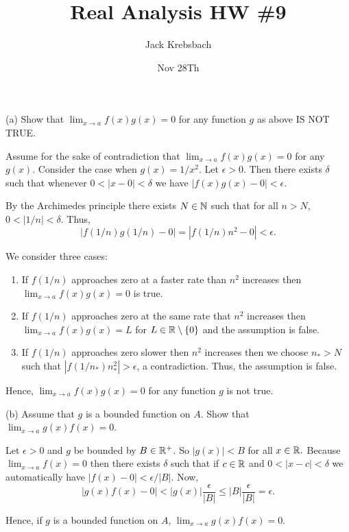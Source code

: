 \documentclass{report}
\title{Real Analysis HW \#9}
\author{Jack Krebsbach }
\date{Nov 28Th}
\begin{document}
\maketitle


(a) Show that $\lim _{x \rightarrow a} f(x) g(x)=0$ for any function $g$ as above IS NOT TRUE.

\begin{myproof}
     Assume for the sake of contradiction that $\lim _{x \rightarrow a} f(x) g(x)=0$ for  any $g(x).$ Consider the case when $g(x)= 1/x^2.$ Let $\epsilon >0.$ Then there exists $\delta$ such that whenever $0 < |x - 0| < \delta$ we have $|f(x)g(x) -0|<\epsilon.$

  By the Archimedes principle there exists $N \in \NN$ such that for all $n > N,$ $0 < |1/n| < \delta.$ Thus, $$ |f(1/n)g(1/n)-0|=|f(1/n)n^2 -0|<\epsilon.$$

  We consider three cases:

  \begin{enumerate}
    \item If $f(1/n)$ approaches zero at a faster rate than $n^2$ increases then $\lim _{x \rightarrow a} f(x) g(x)=0$ is true.
    \item If $f(1/n)$ approaches zero at the same rate that $n^2$ increases then $\lim _{x \rightarrow a} f(x) g(x)=L$ for $L \in \RR \setminus \{0\}$ and the assumption is false.
    \item   If $f(1/n)$ approaches zero slower then $n^2$ increases then we  choose $n_* > N$ such that $ |f(1/n_*)n_*^2| > \epsilon$, a contradiction. Thus, the assumption is false.
   \end{enumerate}
Hence, $\lim _{x \rightarrow a} f(x) g(x)=0$ for any function $g$ is not true.

\end{myproof}

\bigskip
\bigskip
\bigskip

(b) Assume that $g$ is a bounded function on $A$. Show that $\lim _{x \rightarrow a} g(x) f(x)=0$.

\begin{myproof}
    Let $\epsilon >0$ and $g$ be bounded by $B \in \RR^+$. So $|g(x)| < B$ for all $x \in \RR.$ Because $\lim _{x \rightarrow a} f(x)=0$ then there exists $\delta$ such that if $c\in \RR$ and $0 < | x -c | <\delta$ we automatically have $|f(x) - 0| <  \epsilon / |B|$.
Now, $$ |g(x)f(x) - 0| < |g(x)|\frac{\epsilon}{\left|B\right|} \leq |B|\frac{\epsilon}{\left|B\right|}  = \epsilon.  $$

Hence, if $g$ is a bounded function on $A$, $\lim _{x \rightarrow a} g(x) f(x)=0.$
\end{myproof}
\end{document}
